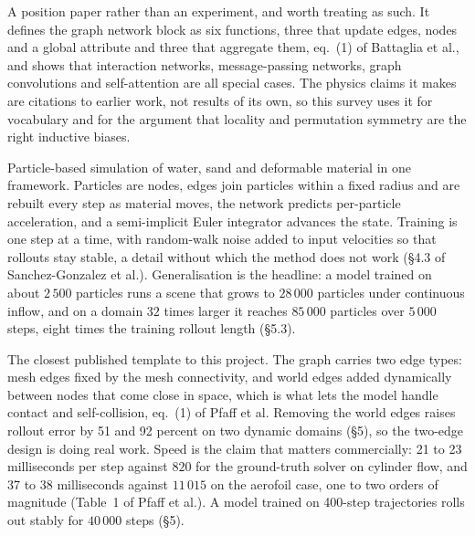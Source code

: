 \documentclass[11pt, a4paper]{article}
\begin{document}
\begin{description}[style=nextline]
  \item[Battaglia et al.~\citep{battaglia2018}]
  A position paper rather than an experiment, and worth treating as such. It
  defines the graph network block as six functions, three that update edges,
  nodes and a global attribute and three that aggregate them, eq.~(1) of
  Battaglia et al., and shows that interaction networks, message-passing
  networks, graph convolutions and self-attention are all special cases. The
  physics claims it makes are citations to earlier work, not results of its
  own, so this survey uses it for vocabulary and for the argument that
  locality and permutation symmetry are the right inductive biases.
  \item[Sanchez-Gonzalez et al., graph network-based simulators,
  GNS~\citep{sanchez2020}]
  Particle-based simulation of water, sand and deformable material in one
  framework. Particles are nodes, edges join particles within a fixed radius
  and are rebuilt every step as material moves, the network predicts
  per-particle acceleration, and a semi-implicit Euler integrator advances the
  state. Training is one step at a time, with random-walk noise added to input
  velocities so that rollouts stay stable, a detail without which the method
  does not work (\S{}4.3 of Sanchez-Gonzalez et al.). Generalisation is the
  headline: a model trained on about $2\,500$ particles runs a scene that
  grows to $28\,000$ particles under continuous inflow, and on a domain $32$
  times larger it reaches $85\,000$ particles over $5\,000$ steps, eight times
  the training rollout length (\S{}5.3).
  \item[Pfaff et al., MeshGraphNets~\citep{pfaff2020}]
  The closest published template to this project. The graph carries two edge
  types: mesh edges fixed by the mesh connectivity, and world edges added
  dynamically between nodes that come close in space, which is what lets the
  model handle contact and self-collision, eq.~(1) of Pfaff et al. Removing
  the world edges raises rollout error by 51 and 92 percent on two dynamic
  domains (\S{}5), so the two-edge design is doing real work. Speed is the
  claim that matters commercially: 21 to 23 milliseconds per step against
  $820$ for the ground-truth solver on cylinder flow, and 37 to 38
  milliseconds against $11\,015$ on the aerofoil case, one to two orders of
  magnitude (Table~1 of Pfaff et al.). A model trained on 400-step
  trajectories rolls out stably for $40\,000$ steps (\S{}5).
\end{description}
\end{document}
